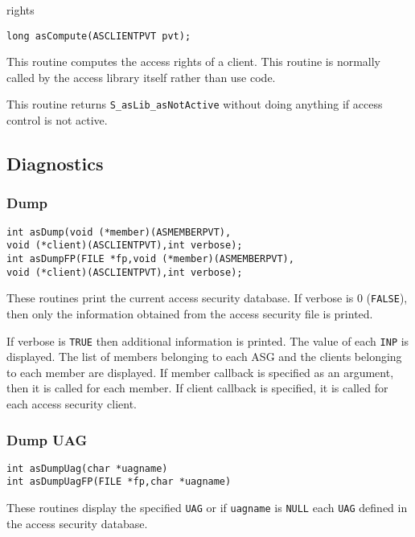 rights

\begin{verbatim}
long asCompute(ASCLIENTPVT pvt); 
\end{verbatim}

This routine computes the access rights of a client. This routine is normally called by the access library itself rather than 
use code.

This routine returns \verb|S_asLib_asNotActive| without doing anything if access control is not active.

\subsection{Diagnostics}

\subsubsection{Dump}

\begin{verbatim}
int asDump(void (*member)(ASMEMBERPVT),
void (*client)(ASCLIENTPVT),int verbose);
int asDumpFP(FILE *fp,void (*member)(ASMEMBERPVT),
void (*client)(ASCLIENTPVT),int verbose);
\end{verbatim}

These routines print the current access security database. If verbose is 0 (\verb|FALSE|), then only the information obtained 
from the access security file is printed.

If verbose is \verb|TRUE| then additional information is printed. The value of each \verb|INP| is displayed. The list of members 
belonging to each ASG and the clients belonging to each member are displayed. If member callback is specified as an 
argument, then it is called for each member. If client callback is specified, it is called for each access security client.

\subsubsection{Dump UAG}

\begin{verbatim}
int asDumpUag(char *uagname)
int asDumpUagFP(FILE *fp,char *uagname)
\end{verbatim}

These routines display the specified \verb|UAG| or if \verb|uagname| is \verb|NULL| each \verb|UAG| defined in the access security database.


